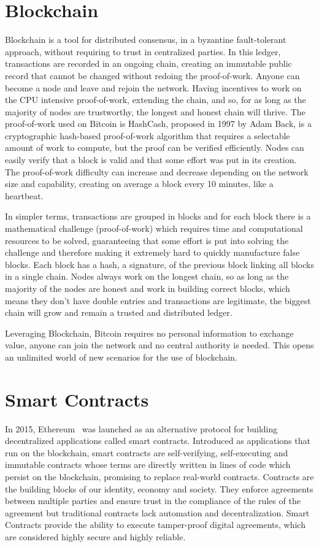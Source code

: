 \section{Blockchain}

Blockchain is a tool for distributed consensus, in a byzantine fault-tolerant approach, without requiring to trust in centralized parties. In this ledger, transactions are recorded in an ongoing chain, creating an immutable public record that cannot be changed without redoing the proof-of-work. Anyone can become a node and leave and rejoin the network. Having incentives to work on the CPU intensive proof-of-work, extending the chain, and so, for as long as the majority of nodes are trustworthy, the longest and honest chain will thrive. The proof-of-work used on Bitcoin is HashCash, proposed in 1997 by Adam Back, is a cryptographic hash-based proof-of-work algorithm that requires a selectable amount of work to compute, but the proof can be verified efficiently. Nodes can easily verify that a block is valid and that some effort was put in its creation. The proof-of-work difficulty can increase and decrease depending on the network size and capability, creating on average a block every 10 minutes, like a heartbeat.

In simpler terms, transactions are grouped in blocks and for each block there is a mathematical challenge (proof-of-work) which requires time and computational resources to be solved, guaranteeing that some effort is put into solving the challenge and therefore making it extremely hard to quickly manufacture false blocks. Each block has a hash, a signature, of the previous block linking all blocks in a single chain. Nodes always work on the longest chain, so as long as the majority of the nodes are honest and work in building correct blocks, which means they don't have double entries and transactions are legitimate, the biggest chain will grow and remain a trusted and distributed ledger.

Leveraging Blockchain, Bitcoin requires no personal information to exchange value, anyone can join the network and no central authority is needed. This opens an unlimited world of new scenarios for the use of blockchain.



\section{Smart Contracts}

In 2015, Ethereum~\citet{GavinWood2014} was launched as an alternative protocol for building decentralized applications called smart contracts. Introduced as applications that run on the blockchain, smart contracts are self-verifying, self-executing and immutable contracts whose terms are directly written in lines of code which persist on the blockchain, promising to replace real-world contracts. Contracts are the building blocks of our identity, economy and society. They enforce agreements between multiple parties and ensure trust in the compliance of the rules of the agreement but traditional contracts lack automation and decentralization. Smart Contracts provide the ability to execute tamper-proof digital agreements, which are considered highly secure and highly reliable.

